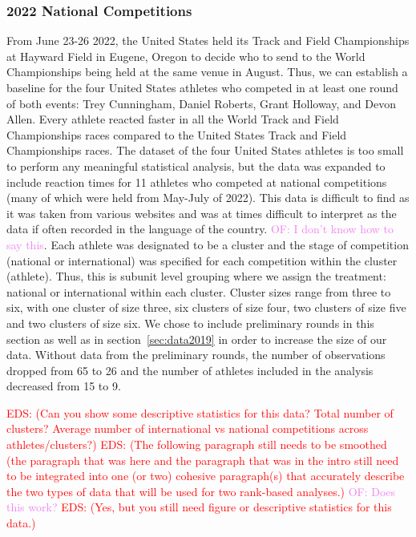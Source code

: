 \documentclass[12pt, letterpaper, titlepage]{article}
\newcommand{\eds}[1]{\textcolor{red}{EDS: (#1)}}
\newcommand{\of}[1]{\textcolor{violet}{OF: #1}}
\begin{document}
\subsubsection{2022 National Competitions}\label{sec:datanational}
From June 23-26 2022, the United States held its Track and Field Championships 
at Hayward Field in Eugene, Oregon to decide who to send to the World 
Championships being held at the same venue in August. Thus, we can establish a 
baseline for the four United States athletes who competed in at least one round 
of both events: Trey Cunningham, Daniel Roberts, Grant Holloway, and Devon Allen.   
Every athlete reacted faster in all the World Track and Field Championships 
races compared to the United States Track and Field Championships races. The 
dataset of the four United States athletes is too small to perform any 
meaningful statistical analysis, but the data was expanded to include reaction 
times for 11 athletes who competed at national competitions (many of which were 
held from May-July of 2022). This data is difficult to find as it was taken from 
various websites and was at times difficult to interpret as the data if often 
recorded in the language of the country. \of{I don't know how to say this}. Each
athlete was designated to be a cluster and the stage of competition (national or international) was specified for each competition within the cluster (athlete).
Thus, this is subunit level grouping where we assign the treatment: national or
international within each cluster.  Cluster sizes range from three to six, with
one cluster of size three, six clusters of size four, two clusters of size five
and two clusters of size six.  We chose to include preliminary rounds in this
section as well as in section~\ref{sec:data2019} in order to increase the size of our
data.  Without data from the preliminary rounds, the number of observations
dropped from 65 to 26 and the number of athletes included in the analysis
decreased from 15 to 9.



\eds{Can you show some descriptive statistics for this data?  Total number of 
clusters? Average number of international vs national competitions across 
athletes/clusters?}
\eds{The following paragraph still needs to be smoothed (the paragraph that was 
here and the paragraph that was in the intro still need to be integrated into 
one (or two) cohesive paragraph(s) that accurately describe the two types of 
data that will be used for two rank-based analyses.}
\of{Does this work?}
\eds{Yes, but you still need figure or descriptive statistics for this data.} 
\end{document}
